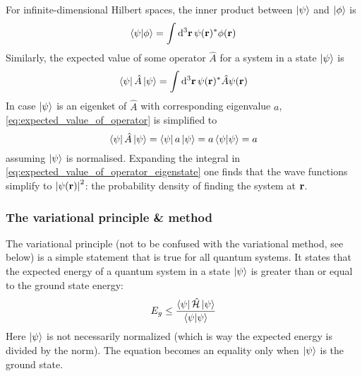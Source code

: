 \documentclass[nofootinbib,reprint,english]{revtex4-1}
\newcommand{\hatHH}{\hat{\mathcal{H}}}
\begin{document}
For infinite-dimensional Hilbert spaces, the inner product between \(\ket{\psi}\) and \(\ket{\phi}\) is
\begin{equation}
\braket{\psi}{\phi}=\int\dd[3]{\vb{r}}\psi(\vb{r})^*\phi(\vb{r})
\end{equation}
Similarly, the expected value of some operator \(\hat{A}\) for a system in a state \(\ket{\psi}\) is
\begin{equation}\label{eq:expected_value_of_operator}
\bra{\psi}\hat{A}\ket{\psi}=\int\dd[3]{\vb{r}}\psi(\vb{r})^*\hat{A}\psi(\vb{r})
\end{equation}
In case \(\ket{\psi}\) is an eigenket of \(\hat{A}\) with corresponding eigenvalue \(a\), \eqref{eq:expected_value_of_operator} is simplified to
\begin{equation}\label{eq:expected_value_of_operator_eigenstate}
\bra{\psi}\hat{A}\ket{\psi}=\bra{\psi}a\ket{\psi}=a\braket{\psi}{\psi}=a
\end{equation}
assuming \(\ket{\psi}\) is normalised. Expanding the integral in \eqref{eq:expected_value_of_operator_eigenstate} one finds that the wave functions simplify to \(\abs{\psi(\vb{r})}^2\): the probability density of finding the system at \(\vb{r}\).
\subsubsection{The variational principle \& method}
The variational principle (not to be confused with the variational method, see below) is a simple statement that is true for all quantum systems. It states that the expected energy of a quantum system in a state \(\ket{\psi}\) is greater than or equal to the ground state energy:
\begin{equation}\label{eq:variational_principle}
E_g\leq\frac{\bra{\psi}\hatHH\ket{\psi}}{\braket{\psi}}
\end{equation}
Here \(\ket{\psi}\) is not necessarily normalized (which is way the expected energy is divided by the norm). The equation becomes an equality only when \(\ket{\psi}\) is the ground state. 
\end{document}

